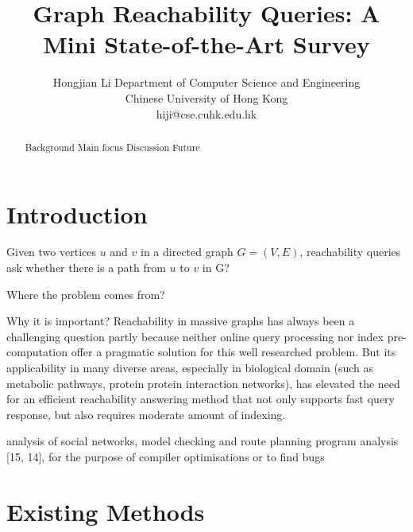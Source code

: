 \documentclass[12pt, conference, compsocconf]{../IEEEtran}
\begin{document}
\title{Graph Reachability Queries: A Mini State-of-the-Art Survey}
\author
{
\IEEEauthorblockN
{
Hongjian Li
\IEEEauthorblockA
{
Department of Computer Science and Engineering\\
Chinese University of Hong Kong\\
hiji@cse.cuhk.edu.hk
}
}
}
\maketitle

\begin{abstract}

Background
Main focus
Discussion
Future

\end{abstract}




\section{Introduction}

Given two vertices $u$ and $v$ in a directed graph $G = (V, E)$, reachability queries ask whether there is a path from $u$ to $v$ in G?

Where the problem comes from?

Why it is important?
Reachability in massive graphs has always been a challenging question partly because neither online query processing nor index pre-computation offer a pragmatic solution for this well researched problem. But its applicability in many diverse areas, especially in biological domain (such as metabolic pathways, protein protein interaction networks), has elevated the need for an efficient reachability answering method that not only supports fast query response, but also requires moderate amount of indexing.

analysis of social networks, model
checking and route planning
program analysis [15, 14], for
the purpose of compiler optimisations or to find bugs


\section{Existing Methods}
\end{document}
